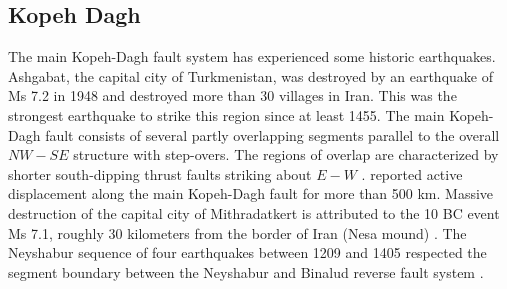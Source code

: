 \subsection{Kopeh Dagh}
The main Kopeh-Dagh fault system has experienced some historic earthquakes. Ashgabat, the capital city of Turkmenistan, was destroyed by an earthquake of Ms 7.2 in 1948 and destroyed more than 30 villages in Iran. This was the strongest earthquake to strike this region since at least 1455.
The main Kopeh-Dagh fault consists of several partly overlapping segments parallel to the overall $NW - SE$ structure with step-overs. The regions of overlap are characterized by shorter south-dipping thrust faults striking about $E - W$ \citep{Berberian2001}. \citet{Trifonov1978} reported active displacement along the main Kopeh-Dagh fault for more than 500 km. 
Massive destruction of the capital city of Mithradatkert is attributed to the 10 BC event Ms 7.1, roughly 30 kilometers from the border of Iran (Nesa mound) \citep{Berberian2001}.
The Neyshabur sequence of four earthquakes between 1209 and 1405 respected the segment boundary between the Neyshabur and Binalud reverse fault system \citep{Berberian1999}.


